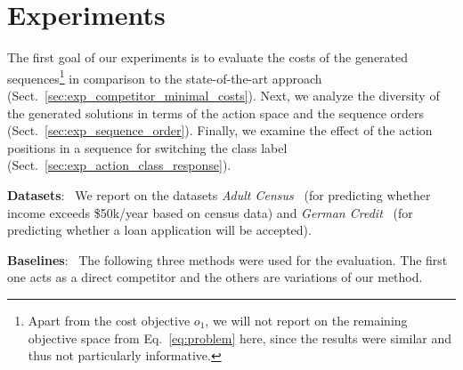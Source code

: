 \documentclass[runningheads, envcountsame, a4paper]{llncs}
\newcommand{\adultDataset}{\emph{Adult Census}}
\newcommand{\germanDataset}{\emph{German Credit}}
\newcommand{\objective}{o}
\newcommand{\seqCosts}{\objective_{1}}
\begin{document}
\section{Experiments}
\label{sec:experiments}
The first goal of our experiments is to evaluate the costs of the generated sequences\footnote{Apart from the cost objective $\seqCosts$, we will not report on the remaining objective space from Eq.~\ref{eq:problem} here, since the results were similar and thus not particularly informative.} in comparison to the state-of-the-art approach~\cite{ramakrishnanSynthesizingActionSequences2020} (Sect.~\ref{sec:exp_competitor_minimal_costs}).
Next, we analyze the diversity of the generated solutions in terms of the action space and the sequence orders (Sect.~\ref{sec:exp_sequence_order}).
Finally, we examine the effect of the action positions in a sequence for switching the class label (Sect.~\ref{sec:exp_action_class_response}).

\textbf{Datasets}: \,
We report on the datasets \adultDataset{}~\cite{duaUCIMachineLearning2017} (for predicting whether income exceeds \$50k/year based on census data) and \germanDataset{}~\cite{duaUCIMachineLearning2017} (for predicting whether a loan application will be accepted).

\textbf{Baselines}: \,
The following three methods were used for the evaluation. The first one acts as a direct competitor and the others are variations of our method.
\end{document}

